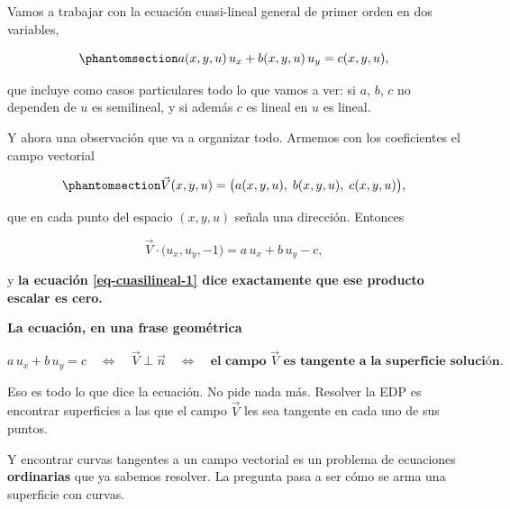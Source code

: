 \documentclass[
  spanish,
  a4paper,
]{scrbook}
\theoremstyle{definition}
\theoremstyle{plain}
\theoremstyle{definition}
\theoremstyle{plain}
\theoremstyle{definition}
\theoremstyle{remark}
\begin{document}
Vamos a trabajar con la ecuación cuasi-lineal general de primer orden en
dos variables,

\begin{equation}\protect\phantomsection\label{eq-cuasilineal-1}{
a(x,y,u)\,u_x + b(x,y,u)\,u_y = c(x,y,u),
}\end{equation}

que incluye como casos particulares todo lo que vamos a ver: si \(a\),
\(b\), \(c\) no dependen de \(u\) es semilineal, y si además \(c\) es
lineal en \(u\) es lineal.

Y ahora una observación que va a organizar todo. Armemos con los
coeficientes el campo vectorial

\begin{equation}\protect\phantomsection\label{eq-campo}{
\vec V(x,y,u) = \big(a(x,y,u),\; b(x,y,u),\; c(x,y,u)\big) ,
}\end{equation}

que en cada punto del espacio \((x,y,u)\) señala una dirección. Entonces

\[
\vec V \cdot \big(u_x, u_y, -1\big) = a\,u_x + b\,u_y - c ,
\]

y \textbf{la ecuación \ref{eq-cuasilineal-1} dice exactamente que ese
producto escalar es cero.}

\begin{tcolorbox}[enhanced jigsaw, arc=.35mm, bottomrule=.15mm, breakable, colback=white, colframe=quarto-callout-important-color-frame, left=2mm, leftrule=.75mm, opacityback=0, rightrule=.15mm, toprule=.15mm]
\begin{minipage}[t]{5.5mm}
\textcolor{quarto-callout-important-color}{\faExclamation}
\end{minipage}%
\begin{minipage}[t]{\textwidth - 5.5mm}

\vspace{-3mm}\textbf{La ecuación, en una frase geométrica}\vspace{3mm}

\[
a\,u_x + b\,u_y = c
\quad\Longleftrightarrow\quad
\vec V \perp \vec n
\quad\Longleftrightarrow\quad
\textbf{el campo } \vec V \textbf{ es tangente a la superficie solución.}
\]

Eso es todo lo que dice la ecuación. No pide nada más. Resolver la EDP
es encontrar superficies a las que el campo \(\vec V\) les sea tangente
en cada uno de sus puntos.

Y encontrar curvas tangentes a un campo vectorial es un problema de
ecuaciones \textbf{ordinarias} que ya sabemos resolver. La pregunta pasa
a ser cómo se arma una superficie con curvas.

\end{minipage}%
\end{tcolorbox}
\end{document}
